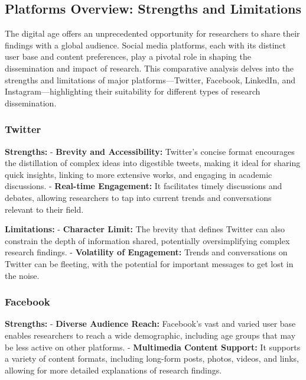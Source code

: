 \documentclass[
]{book}
\begin{document}
\hypertarget{platforms-overview-strengths-and-limitations}{%
\subsection*{Platforms Overview: Strengths and Limitations}\label{platforms-overview-strengths-and-limitations}}

The digital age offers an unprecedented opportunity for researchers to share their findings with a global audience. Social media platforms, each with its distinct user base and content preferences, play a pivotal role in shaping the dissemination and impact of research. This comparative analysis delves into the strengths and limitations of major platforms---Twitter, Facebook, LinkedIn, and Instagram---highlighting their suitability for different types of research dissemination.

\hypertarget{twitter}{%
\subsubsection*{Twitter}\label{twitter}}

\textbf{Strengths:}
- \textbf{Brevity and Accessibility:} Twitter's concise format encourages the distillation of complex ideas into digestible tweets, making it ideal for sharing quick insights, linking to more extensive works, and engaging in academic discussions.
- \textbf{Real-time Engagement:} It facilitates timely discussions and debates, allowing researchers to tap into current trends and conversations relevant to their field.

\textbf{Limitations:}
- \textbf{Character Limit:} The brevity that defines Twitter can also constrain the depth of information shared, potentially oversimplifying complex research findings.
- \textbf{Volatility of Engagement:} Trends and conversations on Twitter can be fleeting, with the potential for important messages to get lost in the noise.

\hypertarget{facebook}{%
\subsubsection*{Facebook}\label{facebook}}

\textbf{Strengths:}
- \textbf{Diverse Audience Reach:} Facebook's vast and varied user base enables researchers to reach a wide demographic, including age groups that may be less active on other platforms.
- \textbf{Multimedia Content Support:} It supports a variety of content formats, including long-form posts, photos, videos, and links, allowing for more detailed explanations of research findings.
\end{document}
